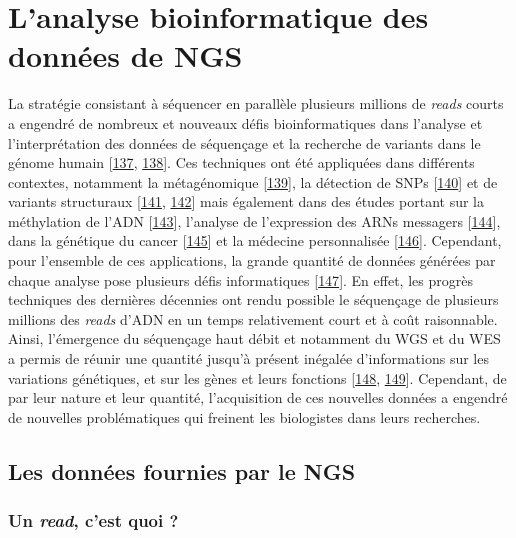 \documentclass[12pt,a4paper,twoside]{ugathesis}
\theoremstyle{definition}
\theoremstyle{definition}
\theoremstyle{definition}
\theoremstyle{remark}
\begin{document}
\newpage  

\section{L'analyse bioinformatique des données de
NGS}\label{lanalyse-bioinformatique-des-donnees-de-ngs}

La stratégie consistant à séquencer en parallèle plusieurs millions de
\emph{reads} courts a engendré de nombreux et nouveaux défis
bioinformatiques dans l'analyse et l'interprétation des données de
séquençage et la recherche de variants dans le génome humain
{[}\protect\hyperlink{ref-Wold2007}{137},
\protect\hyperlink{ref-Yang2009}{138}{]}. Ces techniques ont été
appliquées dans différents contextes, notamment la métagénomique
{[}\protect\hyperlink{ref-Qin2010}{139}{]}, la détection de SNPs
{[}\protect\hyperlink{ref-VanTassell2008}{140}{]} et de variants
structuraux {[}\protect\hyperlink{ref-Alkan2010}{141},
\protect\hyperlink{ref-Medvedev2009}{142}{]} mais également dans des
études portant sur la méthylation de l'ADN
{[}\protect\hyperlink{ref-Taylor2007}{143}{]}, l'analyse de l'expression
des ARNs messagers {[}\protect\hyperlink{ref-Sultan2008}{144}{]}, dans
la génétique du cancer {[}\protect\hyperlink{ref-Guffanti2009}{145}{]}
et la médecine personnalisée
{[}\protect\hyperlink{ref-Auffray2009}{146}{]}. Cependant, pour
l'ensemble de ces applications, la grande quantité de données générées
par chaque analyse pose plusieurs défis informatiques
{[}\protect\hyperlink{ref-Horner2009}{147}{]}. En effet, les progrès
techniques des dernières décennies ont rendu possible le séquençage de
plusieurs millions des \emph{reads} d'ADN en un temps relativement court
et à coût raisonnable. Ainsi, l'émergence du séquençage haut débit et
notamment du WGS et du WES a permis de réunir une quantité jusqu'à
présent inégalée d'informations sur les variations génétiques, et sur
les gènes et leurs fonctions {[}\protect\hyperlink{ref-Mardis2008}{148},
\protect\hyperlink{ref-Bentley2006}{149}{]}. Cependant, de par leur
nature et leur quantité, l'acquisition de ces nouvelles données a
engendré de nouvelles problématiques qui freinent les biologistes dans
leurs recherches.

\subsection{Les données fournies par le
NGS}\label{les-donnees-fournies-par-le-ngs}

\subsubsection{\texorpdfstring{Un \emph{read}, c'est quoi
?}{Un read, c'est quoi ?}}\label{un-read-cest-quoi}
\end{document}
